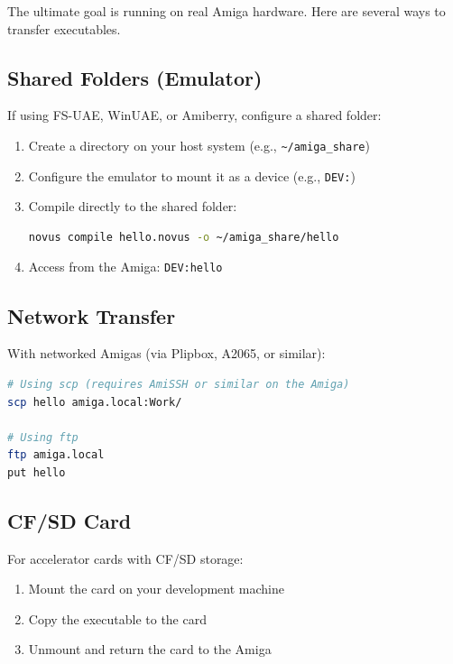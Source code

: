 The ultimate goal is running on real Amiga hardware. Here are several ways to transfer executables.

\subsection{Shared Folders (Emulator)}

If using FS-UAE, WinUAE, or Amiberry, configure a shared folder:

\begin{enumerate}
\item Create a directory on your host system (e.g., \texttt{\textasciitilde/amiga\_share})
\item Configure the emulator to mount it as a device (e.g., \texttt{DEV:})
\item Compile directly to the shared folder:
\begin{lstlisting}[language=bash]
novus compile hello.novus -o ~/amiga_share/hello
\end{lstlisting}
\item Access from the Amiga: \texttt{DEV:hello}
\end{enumerate}

\subsection{Network Transfer}

With networked Amigas (via Plipbox, A2065, or similar):

\begin{lstlisting}[language=bash]
# Using scp (requires AmiSSH or similar on the Amiga)
scp hello amiga.local:Work/

# Using ftp
ftp amiga.local
put hello
\end{lstlisting}

\subsection{CF/SD Card}

For accelerator cards with CF/SD storage:

\begin{enumerate}
\item Mount the card on your development machine
\item Copy the executable to the card
\item Unmount and return the card to the Amiga
\end{enumerate}

